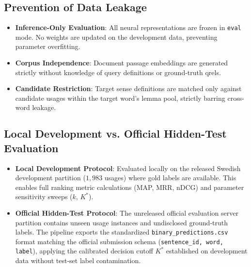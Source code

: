 \subsection{Prevention of Data Leakage}
\begin{itemize}
    \item \textbf{Inference-Only Evaluation}: All neural representations are frozen in \texttt{eval} mode. No weights are updated on the development data, preventing parameter overfitting.
    \item \textbf{Corpus Independence}: Document passage embeddings are generated strictly without knowledge of query definitions or ground-truth qrels.
    \item \textbf{Candidate Restriction}: Target sense definitions are matched only against candidate usages within the target word's lemma pool, strictly barring cross-word leakage.
\end{itemize}

\subsection{Local Development vs. Official Hidden-Test Evaluation}
\begin{itemize}
    \item \textbf{Local Development Protocol}: Evaluated locally on the released Swedish development partition ($1,983$ usages) where gold labels are available. This enables full ranking metric calculations (MAP, MRR, nDCG) and parameter sensitivity sweeps ($k$, $K^*$).
    \item \textbf{Official Hidden-Test Protocol}: The unreleased official evaluation server partition contains unseen usage instances and undisclosed ground-truth labels. The pipeline exports the standardized \texttt{binary\_predictions.csv} format matching the official submission schema (\texttt{sentence\_id, word, label}), applying the calibrated decision cutoff $K^*$ established on development data without test-set label contamination.
\end{itemize}


